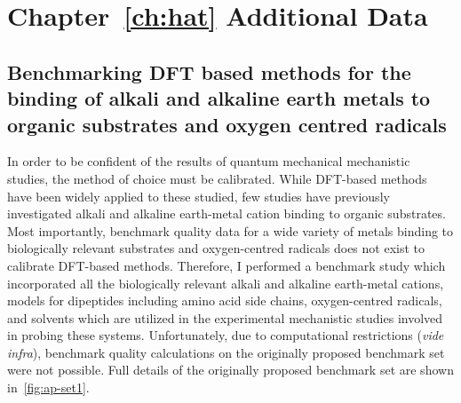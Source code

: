 \chapter{Chapter~\protect\ref{ch:hat} Additional Data}\label{ap:hat}

\section{Benchmarking DFT based methods for the binding of alkali and alkaline
earth metals to organic substrates and oxygen centred radicals}
\label{sec:benchmark}

In order to be confident of the results of quantum mechanical mechanistic
studies, the method of choice must be calibrated. While DFT-based methods have
been widely applied to these studied, few studies have previously investigated
alkali and alkaline earth-metal cation binding to organic
substrates.\cite{Corral2003, Suarez2011, Siu2001, Baldauf2013} Most importantly,
benchmark quality data for a wide variety of metals binding to biologically
relevant substrates and oxygen-centred radicals does not exist to calibrate
DFT-based methods. Therefore, I performed a benchmark study which incorporated
all the biologically relevant alkali and alkaline earth-metal cations, models
for dipeptides including amino acid side chains, oxygen-centred radicals, and
solvents which are utilized in the experimental mechanistic studies involved in
probing these systems. Unfortunately, due to computational restrictions
(\emph{vide infra}), benchmark quality calculations on the originally proposed
benchmark set were not possible. Full details of the originally proposed
benchmark set are shown in~\ref{fig:ap-set1}.

